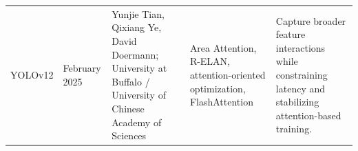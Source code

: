 \documentclass[11pt,a4paper]{article}
\begin{document}
\begin{landscape}
\begin{longtable}{@{}P{1.65cm}P{2.0cm}P{4.25cm}P{6.55cm}P{6.65cm}@{}}
YOLOv12 \cite{tian2025yolov12} & February 2025 & Yunjie Tian, Qixiang Ye, David Doermann; University at Buffalo / University of Chinese Academy of Sciences & Area Attention, R-ELAN, attention-oriented optimization, FlashAttention & Capture broader feature interactions while constraining latency and stabilizing attention-based training. \\
\end{longtable}
\endgroup
\end{landscape}

\clearpage

\begingroup
\small{}


\endgroup
\end{document}
